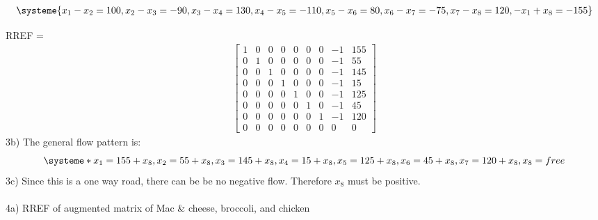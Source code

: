 \documentclass{article}
\begin{document}
\begin{align*}
    \systeme{
    x_1 - x_2 = 100,
    x_2 - x_3 = -90,
    x_3 - x_4 = 130,
    x_4 - x_5 = -110,
    x_5 - x_6 = 80,
    x_6-x_7 = -75, 
    x_7 - x_8 = 120, 
    -x_1 + x_8 = -155 } 
\end{align*}

RREF =  
\begin{align*}
    \begin{bmatrix}
1 & 0 & 0 & 0 & 0 & 0 & 0 & -1 & 155 \\
0 & 1 & 0 & 0 & 0 & 0 & 0 & -1 & 55 \\
0 & 0 & 1 & 0 & 0 & 0 & 0 & -1 & 145 \\
0 & 0 & 0 & 1 & 0 & 0 & 0 & -1 & 15 \\
0 & 0 & 0 & 0 & 1 & 0 & 0 & -1 & 125 \\
0 & 0 & 0 & 0 & 0 & 1 & 0 & -1 & 45 \\
0 & 0 & 0 & 0 & 0 & 0 & 1 & -1 & 120 \\
0 & 0 & 0 & 0 & 0 & 0 & 0 & 0 & 0 
\end{bmatrix} 
\end{align*} 
3b) The general flow pattern is:
\[
\systeme*{
x_1 = 155 + x_8, 
x_2 = 55 + x_8,
x_3 = 145 + x_8,
x_4 = 15 + x_8,
x_5 = 125 + x_8,
x_6 = 45 + x_8,
x_7 = 120 + x_8,
x_8 = free
}
\]
3c) Since this is a one way road, there can be be no negative flow. Therefore $x_8$ must be positive.   
\\ 
\\
4a) RREF of augmented matrix of Mac \& cheese, broccoli, and chicken
\end{document}
